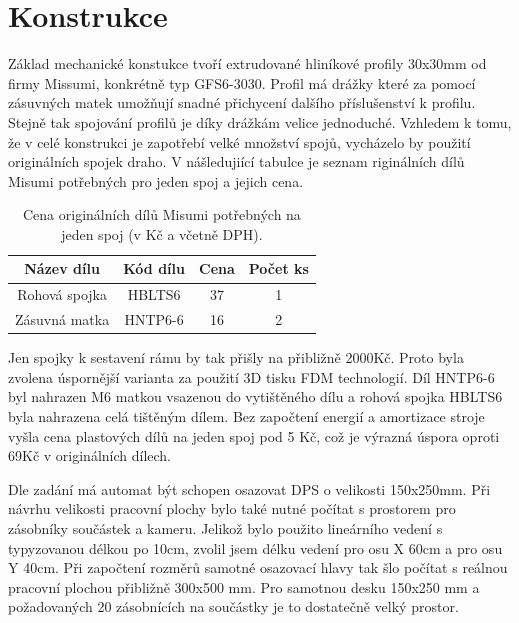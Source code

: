 \chapter{Konstrukce}

Základ mechanické konstukce tvoří extrudované hliníkové profily 30x30mm od firmy Missumi, konkrétně typ GFS6-3030. Profil má drážky které za pomocí zásuvných matek umožňují snadné přichycení dalšího příslušenství k profilu. Stejně tak spojování profilů je díky drážkám velice jednoduché. Vzhledem k tomu, že v celé konstrukci je zapotřebí velké množství spojů, vycházelo by použití originálních spojek draho. V nášledujiící tabulce je seznam riginálních dílů Misumi potřebných pro jeden spoj a  jejich cena.

\begin{table}[h!]
  \caption{Cena originálních dílů Misumi potřebných na jeden spoj (v Kč a včetně DPH). }
  \begin{center}
  	\small
	  \begin{tabular}{|c|c|c|c|}
	    \hline
	    	Název dílu	& Kód dílu	& Cena		&Počet ks	\\
	    \hline\hline

		Rohová spojka 	& HBLTS6	& 37		& 1		\\
		\hline
		Zásuvná matka 	& HNTP6-6 	& 16		& 2		\\
		\hline
	    \hline
	  \end{tabular}
  \end{center}
\end{table}


Jen spojky k sestavení rámu by tak přišly na přibližně 2000Kč. Proto byla zvolena úspornější varianta za použití 3D tisku FDM technologií. Díl HNTP6-6 byl nahrazen M6 matkou vsazenou do vytištěného dílu a rohová spojka HBLTS6 byla nahrazena celá tištěným dílem. Bez započtení energií a amortizace stroje vyšla cena plastových dílů na jeden spoj pod 5 Kč, což je výrazná úspora oproti 69Kč v originálních dílech.

Dle zadání má automat být schopen osazovat DPS o velikosti 150x250mm. Při návrhu velikosti pracovní plochy bylo také nutné počítat s prostorem pro zásobníky součástek a kameru. Jelikož bylo použito lineárního vedení s typyzovanou délkou po 10cm, zvolil jsem délku vedení pro osu X 60cm a pro osu Y 40cm. Při započtení rozměrů samotné osazovací hlavy tak šlo počítat s reálnou pracovní plochou přibližně 300x500 mm. Pro samotnou desku 150x250 mm a požadovaných 20 zásobnících na součástky je to dostatečně velký prostor.




